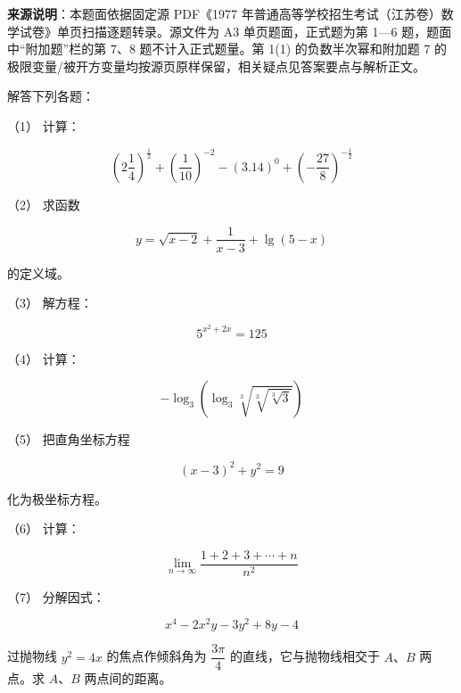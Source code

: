 


\begin{gktip}
\textbf{来源说明}：本题面依据固定源 PDF《1977 年普通高等学校招生考试（江苏卷）数学试卷》单页扫描逐题转录。源文件为 A3 单页题面，正式题为第 1—6 题，题面中“附加题”栏的第 7、8 题不计入正式题量。第 1(1) 的负数半次幂和附加题 7 的极限变量/被开方变量均按源页原样保留，相关疑点见答案要点与解析正文。
\end{gktip}

\begin{question}
解答下列各题：

（1） 计算：

\nopagebreak[4]
\[
\left(2\frac14\right)^{\frac12}+\left(\frac1{10}\right)^{-2}-(3.14)^0+\left(-\frac{27}{8}\right)^{-\frac12}
\]

（2） 求函数

\nopagebreak[4]
\[
y=\sqrt{x-2}+\frac1{x-3}+\lg(5-x)
\]

的定义域。

（3） 解方程：

\nopagebreak[4]
\[
5^{x^2+2x}=125
\]

（4） 计算：

\nopagebreak[4]
\[
-\log_3\left(\log_3\sqrt[3]{\sqrt[3]{\sqrt[3]{3}}}\right)
\]

（5） 把直角坐标方程

\nopagebreak[4]
\[
(x-3)^2+y^2=9
\]

化为极坐标方程。

（6） 计算：

\nopagebreak[4]
\[
\lim_{n\to\infty}\frac{1+2+3+\cdots+n}{n^2}
\]

（7） 分解因式：

\nopagebreak[4]
\[
x^4-2x^2y-3y^2+8y-4
\]

\end{question}
\begin{question}
过抛物线 $y^2=4x$ 的焦点作倾斜角为 $\dfrac{3\pi}{4}$ 的直线，它与抛物线相交于 $A\text{、}B$ 两点。求 $A\text{、}B$ 两点间的距离。

\Needspace{0.4\textheight}
\end{question}
